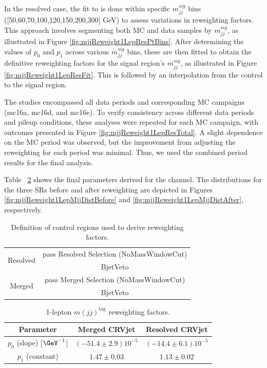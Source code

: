 In the resolved case, the fit to \mjjtag is done within specific $m_{jj}^{sig}$ bins ([50,60,70,100,120,150,200,300] GeV) to assess variations in reweighting factors. This approach involves segmenting both MC and data samples by $m_{jj}^{sig}$, as illustrated in Figure \ref{fig:mjjReweight1LepResPtBins}. After determining the values of $p_0$ and $p_1$ across various $m_{jj}^{sig}$ bins, these are then fitted to obtain the definitive reweighting factors for the signal region's $m_{jj}^{sig}$, as illustrated in Figure \ref{fig:mjjReweight1LepResFit}. This is followed by an interpolation from the control to the signal region.

The studies encompassed all data periods and corresponding MC campaigns (mc16a, mc16d, and mc16e). To verify consistency across different data periods and pileup conditions, these analyses were repeated for each MC campaign, with outcomes presented in Figure \ref{fig:mjjReweight1LepResTotal}.
A slight dependence on the MC period was observed, but the improvement from adjusting the \mjjtag reweighting for each period was minimal. Thus, we used the combined period results for the final analysis.

Table ~\ref{tab:1lepReweighting} shows the final parameters derived for the \olep channel.
The \mjjtag distributions for the three SRs before and after reweighting are depicted in Figures \ref{fig:mjjReweight1LepMjjDistBefore} and \ref{fig:mjjReweight1LepMjjDistAfter}, respectively.

\begin{table}[ht]
    \centering
    \caption{Definition of control regions used to derive \Wjets reweighting factors.}
    \begin{tabular}{|c|c|}
        \hline
        \multirow{2}{4em}{Resolved} & pass Resolved Selection (NoMassWindowCut)  \\
         & BjetVeto  \\
         \hline
        \multirow{2}{4em}{Merged} &  pass Merged Selection (NoMassWindowCut) \\
        & BjetVeto  \\
         \hline
    \end{tabular}
    \label{tab:mjjReweight1LepRegions}
\end{table}


\begin{table}[ht]
     \centering
     \caption{1-lepton $m(jj)^\text{tag}$ reweighting factors.}
     \label{tab:1lepReweighting}
         \begin{tabular}{ |c|c|c| }
\hline
Parameter & Merged CRVjet & Resolved CRVjet  \\
\hline
$p_{0}$ (slope) [$\GeV^{-1}$] & $(-51.4 \pm 2.9)10^{-5}$ &  $(-14.4 \pm 6.1)10^{-5}$ \\
 \hline
$p_{1}$ (constant)  & $1.47 \pm 0.03$ & $1.13 \pm 0.02$ \\
\hline
         \end{tabular}
\end{table}

